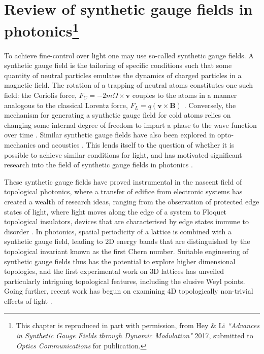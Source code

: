 \chapter[Review of synthetic gauge fields in photonics]{Review of synthetic gauge fields in photonics\footnote{This chapter is reproduced in part with permission, from Hey \& Li \textit{``Advances in Synthetic Gauge Fields through Dynamic Modulation"} 2017, submitted to \textit{Optics Communications} for publication.}}
\label{chapter:synthetic}
To achieve fine-control over light one may use so-called synthetic gauge fields. A synthetic gauge field is the tailoring of specific conditions such that some quantity of neutral particles emulates the dynamics of charged particles in a magnetic field. The rotation of a trapping of neutral atoms constitutes one such field: the Coriolis force, $F_C = -2 m \Omega \times \bm{v}$ couples to the atoms in a manner analogous to the classical Lorentz force, $F_L = q(\bm{v} \times \bm{B})$  \cite{Dalibard2015b}. Conversely, the mechanism for generating a synthetic gauge field for cold atoms relies on changing some internal degree of freedom to impart a phase to the wave function over time \cite{Dalibard2011b}. Similar synthetic gauge fields have also been explored in opto-mechanics \cite{Walter2016, Yang2017}  and acoustics \cite{Miri2017a,Yang2016b}. This lends itself to the question of whether it is possible to achieve similar conditions for light, and has motivated significant research into the field of synthetic gauge fields in photonics \cite{Fang2013b,Fan2015}. 

These synthetic gauge fields have proved instrumental in the nascent field of topological photonics, where a transfer of edifice from electronic systems has created a wealth of research ideas, ranging from the observation of protected edge states of light, where light moves along the edge of a system \cite{Wang2009b,Poshakinskiy2014,Rechtsman2013c,Raghu2008,Barik2016} to Floquet topological insulators, devices that are characterised by edge states immune to disorder \cite{Chen2014,Lumer2013,Zhang2015,Leykam2016,Maczewsky2016,Khanikaev2013}. In photonics, spatial periodicity of a lattice is combined with a synthetic gauge field, leading to 2D energy bands that are distinguished by the topological invariant known as the first Chern number. Suitable engineering of synthetic gauge fields thus has the potential to explore higher dimensional topologies, and the first experimental work on 3D lattices has unveiled particularly intriguing topological features, including the elusive Weyl points. Going further, recent work has begun on examining 4D topologically non-trivial effects of light \cite{Ozawa2016}.

